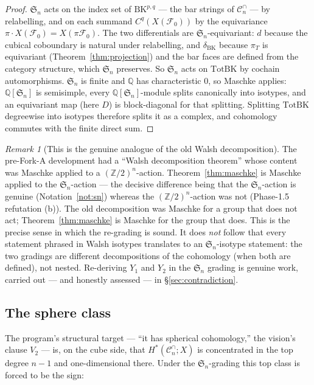 \documentclass[11pt,oneside]{amsart}
\theoremstyle{plain}
\theoremstyle{definition}
\theoremstyle{remark}
\newtheorem{remark}[theorem]{Remark}
\theoremstyle{honeststyle}
\newcommand{\F}{\mathcal{F}}
\newcommand{\Sym}{\mathfrak{S}}
\newcommand{\Z}{\mathbb{Z}}
\newcommand{\Q}{\mathbb{Q}}
\newcommand{\Cn}{\mathcal{C}^{\cap}_n}
\newcommand{\BK}{\mathrm{BK}}
\newcommand{\Tot}{\mathrm{Tot}}
\begin{document}
\begin{proof}
$\Sym_n$ acts on the index set of $\BK^{p,q}$ --- the bar strings of
$\Cn$ --- by relabelling, and on each summand $C^{q}(X(\F_0))$ by the
equivariance $\pi\cdot X(\F_0)=X(\pi\F_0)$. The two differentials are
$\Sym_n$-equivariant: $d$ because the cubical coboundary is natural
under relabelling, and $\delta_{\BK}$ because $\pi_T$ is equivariant
(Theorem~\ref{thm:projection}) and the bar faces are defined from the
category structure, which $\Sym_n$ preserves. So $\Sym_n$ acts on
$\Tot\BK$ by cochain automorphisms. $\Sym_n$ is finite and $\Q$ has
characteristic $0$, so Maschke applies: $\Q[\Sym_n]$ is semisimple,
every $\Q[\Sym_n]$-module splits canonically into isotypes, and an
equivariant map (here $D$) is block-diagonal for that splitting.
Splitting $\Tot\BK$ degreewise into isotypes therefore splits it as a
complex, and cohomology commutes with the finite direct sum.
\end{proof}

\begin{remark}[This is the genuine analogue of the old Walsh decomposition]
\label{rem:maschke-analogue}
The pre-Fork-A development had a ``Walsh decomposition theorem'' whose
content was Maschke applied to a $(\Z/2)^n$-action.
Theorem~\ref{thm:maschke} is Maschke applied to the $\Sym_n$-action
--- the decisive difference being that the $\Sym_n$-action is genuine
(Notation~\ref{not:sn}) whereas the $(\Z/2)^n$-action was not
(Phase-1.5 refutation (b)). The old decomposition was Maschke for a
group that does not act; Theorem~\ref{thm:maschke} is Maschke for the
group that does. This is the precise sense in which the re-grading is
sound. It does \emph{not} follow that every statement phrased in Walsh
isotypes translates to an $\Sym_n$-isotype statement: the two gradings
are different decompositions of the cohomology (when both are defined),
not nested. Re-deriving $Y_1$ and $Y_2$ in the $\Sym_n$ grading is
genuine work, carried out --- and honestly assessed --- in
\S\ref{sec:contradiction}.
\end{remark}

\subsection{The sphere class}
\label{ssec:sphere-class}

The program's structural target --- ``it has spherical cohomology,''
the vision's clause $V_2$ --- is, on the cube side, that
$H^{*}(\Cn;X)$ is concentrated in the top degree $n-1$ and
one-dimensional there. Under the $\Sym_n$-grading this top class is
forced to be the sign:
\end{document}
